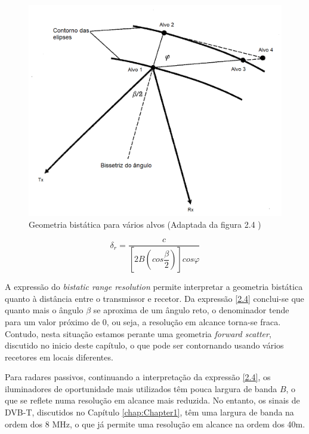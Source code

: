 \begin{figure}[h]
\centering
\includegraphics[scale=0.5]{chapters/ch2/assets/geom_varios_alvos}
\caption[Geometria bistática para vários alvos]{Geometria bistática para vários alvos (Adaptada da figura 2.4 \cite{Griffiths2017})}
\label{fig:geom_varios_alvos}
\end{figure}


\begin{equation} \label{2.4}
\delta_{r}=\dfrac{c}{\left[ 2B\left( cos\dfrac{\beta}{2}\right)\right] cos\varphi}
\end{equation}


A expressão do \textit{bistatic range resolution} permite interpretar a geometria bistática quanto à distância entre o transmissor e recetor. Da expressão \ref{2.4} conclui-se que quanto mais o ângulo $\beta$ se aproxima de um ângulo reto, o denominador tende para um valor próximo de 0, ou seja, a resolução em alcance torna-se fraca. Contudo, nesta situação estamos perante uma geometria \textit{forward scatter}, discutido no inicio deste capítulo, o que pode ser contornando usando vários recetores em locais diferentes.\par 
Para radares passivos, continuando a interpretação da expressão \ref{2.4}, os iluminadores de oportunidade mais utilizados têm pouca largura de banda $B$, o que se reflete numa resolução em alcance mais reduzida. No entanto, os sinais de DVB-T, discutidos no Capítulo \ref{chap:Chapter1}, têm uma largura de banda na ordem dos 8 MHz, o que já permite uma resolução em alcance na ordem dos 40m.

